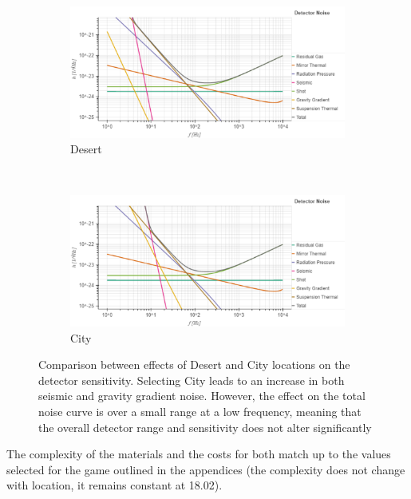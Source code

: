 \documentclass{article}
\begin{document}
    
    \begin{figure}[h!]
\centering
\begin{subfigure}{.8\textwidth}
        \centering
\includegraphics[width=1\linewidth, trim = {0 0 0 1cm}, clip]{aLIGODesert.pdf}
         \caption{Desert}
         \label{fig::PowerStages}
         \end{subfigure}%
         \\
        \begin{subfigure}{.8\textwidth}
        \centering
        \includegraphics[width=1\linewidth, trim = {0 0 0 0.9cm}, clip]{aLIGOCity.pdf}
\caption{City}
          \label{fig::aLIGODesertCity}
         \end{subfigure}
         \caption{Comparison between effects of Desert and City locations on the detector sensitivity. Selecting City leads to an increase in both seismic and gravity gradient noise. However, the effect on the total noise curve is over a small range at a low frequency, meaning that the overall detector range and sensitivity does not alter significantly}
         \label{fig::aLIGOSiliconCrystal}
 \end{figure}
 
 The complexity of the materials and the costs for both match up to the values selected for the game outlined in the appendices (the complexity does not change with location, it remains constant at 18.02). 
\end{document}
